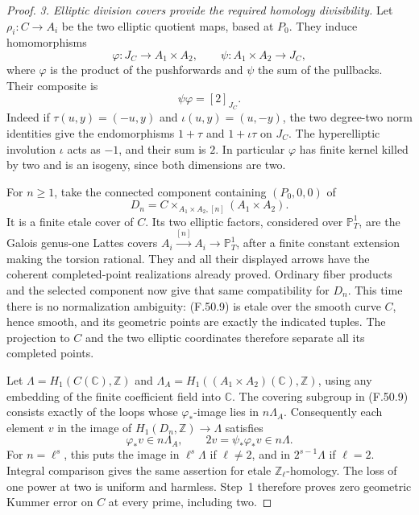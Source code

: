 \documentclass[11pt]{article}
\begin{document}
\begin{proof}
\emph{3. Elliptic division covers provide the required
homology divisibility.}
Let \(\rho_i:C\to A_i\) be the two elliptic quotient
maps, based at \(P_0\). They induce homomorphisms
\[
 \varphi:J_C\longrightarrow A_1\times A_2,
 \qquad
 \psi:A_1\times A_2\longrightarrow J_C,
                                                        \tag{F.50.7}
\]
where \(\varphi\) is the product of the pushforwards
and \(\psi\) the sum of the pullbacks. Their composite
is
\[
                              \psi\varphi=[2]_{J_C}.
                                                        \tag{F.50.8}
\]
Indeed if \(\tau(u,y)=(-u,y)\) and
\(\iota(u,y)=(u,-y)\), the two degree-two norm
identities give the endomorphisms \(1+\tau\) and
\(1+\iota\tau\) on \(J_C\). The hyperelliptic
involution \(\iota\) acts as \(-1\), and their
sum is \(2\). In particular \(\varphi\) has
finite kernel killed by two and is an isogeny,
since both dimensions are two.

For \(n\geq1\), take the connected component
containing \((P_0,0,0)\) of
\[
 D_n=C\mathbin{\times_{A_1\times A_2,[n]}}
                                  (A_1\times A_2).
                                                        \tag{F.50.9}
\]
It is a finite etale cover of \(C\). Its two elliptic
factors, considered over \(\mathbb P^1_T\), are
the Galois genus-one Lattes covers
\(A_i\xrightarrow{[n]}A_i\to\mathbb P^1_T\),
after a finite constant extension making the torsion
rational. They and all their displayed arrows have
the coherent completed-point realizations already
proved. Ordinary fiber products and the selected
component now give that same compatibility for
\(D_n\). This time there is no normalization
ambiguity: (F.50.9) is etale over the smooth curve
\(C\), hence smooth, and its geometric points are
exactly the indicated tuples. The projection to
\(C\) and the two elliptic coordinates therefore
separate all its completed points.

Let \(\Lambda=H_1(C(\mathbb C),\mathbb Z)\) and
\(\Lambda_A=H_1((A_1\times A_2)(\mathbb C),\mathbb Z)\),
using any embedding of the finite coefficient field
into \(\mathbb C\). The covering subgroup in
(F.50.9) consists exactly of the loops whose
\(\varphi_*\)-image lies in \(n\Lambda_A\).
Consequently each element \(v\) in the image of
\(H_1(D_n,\mathbb Z)\to\Lambda\) satisfies
\[
                 \varphi_*v\in n\Lambda_A,
                 \qquad 2v=\psi_*\varphi_*v\in n\Lambda.
                                                        \tag{F.50.10}
\]
For \(n=\ell^s\), this puts the image in
\(\ell^s\Lambda\) if \(\ell\ne2\), and in
\(2^{s-1}\Lambda\) if \(\ell=2\). Integral
comparison gives the same assertion for etale
\(\mathbb Z_\ell\)-homology. The loss of one power
at two is uniform and harmless. Step~1 therefore
proves zero geometric Kummer error on \(C\) at
every prime, including two.


\end{proof}
\end{document}
